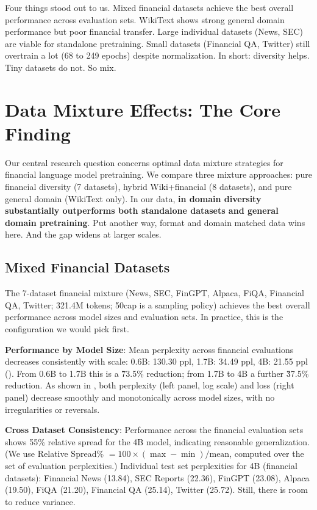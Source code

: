 Four things stood out to us. Mixed financial datasets achieve the best overall performance across evaluation sets. WikiText shows strong general domain performance but poor financial transfer. Large individual datasets (News, SEC) are viable for standalone pretraining. Small datasets (Financial QA, Twitter) still overtrain a lot (68 to 249 epochs) despite normalization. In short: diversity helps. Tiny datasets do not. So mix.

\section{Data Mixture Effects: The Core Finding}

Our central research question concerns optimal data mixture strategies for financial language model pretraining. We compare three mixture approaches: pure financial diversity (7 datasets), hybrid Wiki+financial (8 datasets), and pure general domain (WikiText only). In our data, \textbf{in domain diversity substantially outperforms both standalone datasets and general domain pretraining}. Put another way, format  and domain matched data wins here. And the gap widens at larger scales.

\subsection{Mixed Financial Datasets}

The 7-dataset financial mixture (News, SEC, FinGPT, Alpaca, FiQA, Financial QA, Twitter; 321.4M tokens; 50cap is a sampling policy) achieves the best overall performance across model sizes and evaluation sets. In practice, this is the configuration we would pick first.

\textbf{Performance by Model Size}: Mean perplexity across financial evaluations decreases consistently with scale: 0.6B: 130.30 ppl, 1.7B: 34.49 ppl, 4B: 21.55 ppl (). From 0.6B to 1.7B this is a \~73.5\% reduction; from 1.7B to 4B a further \~37.5\% reduction. As shown in , both perplexity (left panel, log scale) and loss (right panel) decrease smoothly and monotonically across model sizes, with no irregularities or reversals.

\textbf{Cross Dataset Consistency}: Performance across the financial evaluation sets shows 55\% relative spread for the 4B model, indicating reasonable generalization. (We use Relative Spread\% $=100\times(\max-\min)/\text{mean}$, computed over the set of evaluation perplexities.) Individual test set perplexities for 4B (financial datasets): Financial News (13.84), SEC Reports (22.36), FinGPT (23.08), Alpaca (19.50), FiQA (21.20), Financial QA (25.14), Twitter (25.72). Still, there is room to reduce variance.

